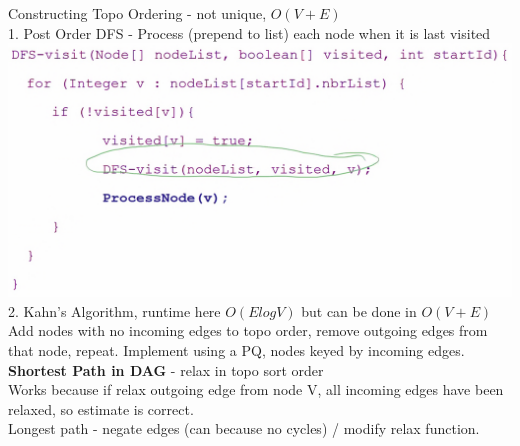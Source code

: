 \documentclass[10pt, a4paper]{article}
\begin{document}
\begin{multicols*}{3}
		Constructing Topo Ordering - not unique, $O(V + E)$\\
		1. Post Order DFS - Process (prepend to list) each node when it is last visited\\
		\includegraphics[scale=.12]{./assets/DAG}\\
		2. Kahn's Algorithm, runtime here $O(ElogV)$ but can be done in $O(V + E)$\\
		Add nodes with no incoming edges to topo order, remove outgoing edges from that node, repeat. 
		Implement using a PQ, nodes keyed by incoming edges.\\
		\textbf{Shortest Path in DAG} - relax in topo sort order\\
		Works because if relax outgoing edge from node V, all incoming edges have been relaxed, so estimate is correct.\\
		Longest path - negate edges (can because no cycles) / modify relax function.\\
		

\end{multicols*}
\end{document}
